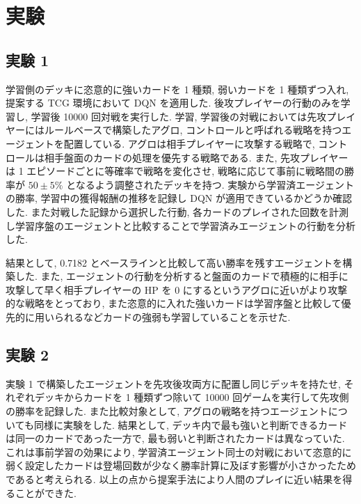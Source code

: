 \documentclass[a4paper,twoside,twocolumn,10pt]{article}
\begin{document}
 

\section{実験}
\subsection{実験 1}
 学習側のデッキに恣意的に強いカードを 1 種類, 弱いカードを 1 種類ずつ入れ, 提案する TCG 環境において DQN を適用した. 後攻プレイヤーの行動のみを学習し, 学習後 10000 回対戦を実行した. 学習, 学習後の対戦においては先攻プレイヤーにはルールベースで構築したアグロ, コントロールと呼ばれる戦略を持つエージェントを配置している. アグロは相手プレイヤーに攻撃する戦略で, コントロールは相手盤面のカードの処理を優先する戦略である. また, 先攻プレイヤーは 1 エピソードごとに等確率で戦略を変化させ, 戦略に応じて事前に戦略間の勝率が $50 \pm 5\%$ となるよう調整されたデッキを持つ. 実験から学習済エージェントの勝率, 学習中の獲得報酬の推移を記録し DQN が適用できているかどうか確認した. また対戦した記録から選択した行動, 各カードのプレイされた回数を計測し学習序盤のエージェントと比較することで学習済みエージェントの行動を分析した.
\par
結果として, 0.7182 とベースラインと比較して高い勝率を残すエージェントを構築した. また, エージェントの行動を分析すると盤面のカードで積極的に相手に攻撃して早く相手プレイヤーの HP を 0 にするというアグロに近いがより攻撃的な戦略をとっており, また恣意的に入れた強いカードは学習序盤と比較して優先的に用いられるなどカードの強弱も学習していることを示せた.
\subsection{実験 2}
実験 1 で構築したエージェントを先攻後攻両方に配置し同じデッキを持たせ, それぞれデッキからカードを 1 種類ずつ除いて 10000 回ゲームを実行して先攻側の勝率を記録した. また比較対象として, アグロの戦略を持つエージェントについても同様に実験をした. 結果として, デッキ内で最も強いと判断できるカードは同一のカードであった一方で, 最も弱いと判断されたカードは異なっていた. これは事前学習の効果により, 学習済エージェント同士の対戦において恣意的に弱く設定したカードは登場回数が少なく勝率計算に及ぼす影響が小さかったためであると考えられる. 以上の点から提案手法により人間のプレイに近い結果を得ることができた.
\end{document}
